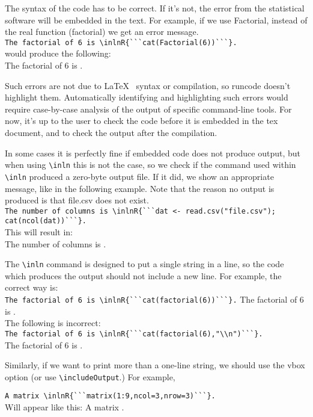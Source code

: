 \documentclass[a4paper,10pt]{article}
\begin{document}
The syntax of the code has to be correct. If it's not, the error from the statistical software will be embedded in the text. For example, if we use Factorial, instead of the real function (factorial) we get an error message.\\
\verb|The factorial of 6 is \inlnR{```cat(Factorial(6))```}.|\\
would produce the following:\\
The factorial of 6 is .

Such errors are not due to \LaTeX~ syntax or compilation, so runcode doesn't highlight them. Automatically identifying and highlighting such errors would require case-by-case analysis of the output of specific command-line tools. For now, it's up to the user to check the code before it is embedded in the tex document, and to check the output after the compilation.

In some cases it is perfectly fine if embedded code does not produce output, but when using \verb|\inln| this is not the case, so we check if the command used within \verb|\inln| produced a zero-byte output file. If it did, we show an appropriate message, like in the following example. Note that the reason no output is produced is that file.csv does not exist.\\
\verb|The number of columns is \inlnR{```dat <- read.csv("file.csv"); cat(ncol(dat))```}.|\\
This will result in:\\
The number of columns is  .

The \verb|\inln| command is designed to put a single string in a line, so the code which produces the output should not include a new line. For example, the correct way is:\\
\verb|The factorial of 6 is \inlnR{```cat(factorial(6))```}.|
The factorial of 6 is .\\
The following is incorrect:\\
\verb|The factorial of 6 is \inlnR{```cat(factorial(6),"\\n")```}.|\\
The factorial of 6 is .

Similarly, if we want to print more than a one-line string, we should use the vbox option (or use \verb|\includeOutput|.) For example,

\verb|A matrix \inlnR{```matrix(1:9,ncol=3,nrow=3)```}.|\\
Will appear like this: A matrix .
\end{document}
